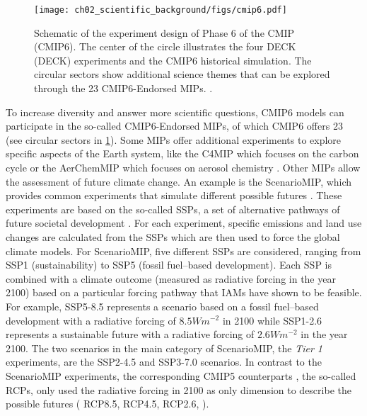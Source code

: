 \begin{figure}[t]
  \centering
  \texttt{[image: 
    ch02\_scientific\_background/figs/cmip6.pdf]}
  \caption[
    Schematic of the experiment design of Phase 6 of the \acl{CMIP}
    (\acs{CMIP}6).
  ]{
    Schematic of the experiment design of Phase 6 of the \acl{CMIP}
    (\acs{CMIP}6). The center of the circle illustrates the four \acs{DECK}
    (\acl{DECK}) experiments and the \acs{CMIP}6 historical simulation. The
    circular sectors show additional science themes that can be explored
    through the 23 \acs{CMIP}6-Endorsed \acfp{MIP}.
    .
  }
  \label{fig:02:cmip6}
\end{figure}

To increase diversity and answer more scientific questions, \acs{CMIP}6 models
can participate in the so-called \acs{CMIP}6-Endorsed \acp{MIP}, of which
\acs{CMIP}6 offers 23 (see circular sectors in \cref{fig:02:cmip6}). Some
\acp{MIP} offer additional experiments to explore specific aspects of the Earth
system, like the \ac{C4MIP} which focuses on the carbon cycle
\autocite{Jones2016} or the \ac{AerChemMIP} which focuses on aerosol chemistry
\autocite{Collins2017}. Other \acp{MIP} allow the assessment of future climate
change. An example is the \ac{ScenarioMIP}, which provides common experiments
that simulate different possible futures \autocite{ONeill2016}. These
experiments are based on the so-called \acp{SSP}, a set of alternative pathways
of future societal development \autocite{ONeill2013, ONeill2017}. For each
experiment, specific emissions and land use changes are calculated from the
\acp{SSP} \autocite{Riahi2017} which are then used to force the global climate
models. For \ac{ScenarioMIP}, five different \acp{SSP} are considered, ranging
from \acs{SSP}1 (sustainability) to \acs{SSP}5 (fossil fuel--based
development). Each \ac{SSP} is combined with a climate outcome (measured as
radiative forcing in the year 2100) based on a particular forcing pathway that
\acp{IAM} have shown to be feasible. For example, \acs{SSP}5-8.5 represents a
scenario based on a fossil fuel--based development with a radiative forcing of
$8.5 \unit{W m^{-2}}$ in 2100 while \acs{SSP}1-2.6 represents a sustainable
future with a radiative forcing of $2.6 \unit{W m^{-2}}$ in the year 2100. The
two scenarios in the main category of \ac{ScenarioMIP}, the \emph{Tier 1}
experiments, are the \acs{SSP}2-4.5 and \acs{SSP}3-7.0 scenarios. In contrast
to the \ac{ScenarioMIP} experiments, the corresponding \acs{CMIP}5 counterparts
\autocite{Taylor2012}, the so-called \acp{RCP}, only used the radiative forcing
in 2100 as only dimension to describe the possible futures (\eg{} \acs{RCP}8.5,
\acs{RCP}4.5, \acs{RCP}2.6, \etc{}).

